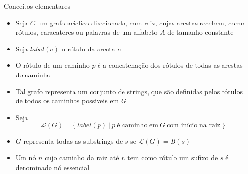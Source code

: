 \begin{frame}[fragile]{Conceitos elementares}

    \begin{itemize}
        \item Seja $G$ um grafo acíclico direcionado, com raiz, cujas arestas recebem, como 
            rótulos, caracateres ou palavras de um alfabeto $A$ de tamanho constante
        \pause

        \item Seja $label(e)$ o rótulo da aresta $e$
        \pause

        \item O rótulo de um caminho $p$ é a concatenação dos rótulos de todas as arestas do 
            caminho
        \pause

        \item Tal grafo representa um conjunto de strings, que são definidas pelos rótulos de 
            todos os caminhos possíveis em $G$
        \pause

        \item Seja
        \[
            \mathcal{L}(G) = \lbrace\ label(p)\ |\ p \ \mbox{é caminho em}\ G \ \mbox{com início na raiz\ }
            \rbrace
        \]
        \pause

        \item $G$ representa todas as substrings de $s$ se $\mathcal{L}(G) = B(s)$
        \pause

        \item Um nó $n$ cujo caminho da raiz até $n$ tem como rótulo um sufixo de $s$ é 
            denominado nó essencial
    \end{itemize}

\end{frame}


